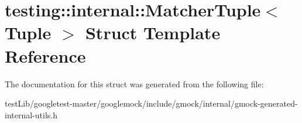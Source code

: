 \hypertarget{structtesting_1_1internal_1_1MatcherTuple}{}\section{testing\+:\+:internal\+:\+:Matcher\+Tuple$<$ Tuple $>$ Struct Template Reference}
\label{structtesting_1_1internal_1_1MatcherTuple}


The documentation for this struct was generated from the following file\+:\begin{DoxyCompactItemize}
\item 
test\+Lib/googletest-\/master/googlemock/include/gmock/internal/gmock-\/generated-\/internal-\/utils.\+h\end{DoxyCompactItemize}
